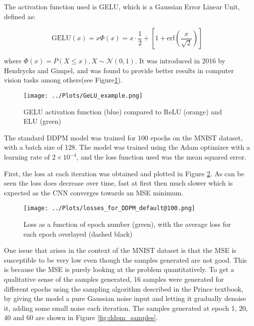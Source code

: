 \documentclass[12pt]{report} %
\begin{document}
The activation function used is GELU, which is a Gaussian Error Linear Unit, defined as:

\begin{equation}
  \text{GELU}(x) = x\Phi(x) = x \cdot \frac{1}{2} + [1 + \text{erf} ( \frac{x}{\sqrt{2}} )]
\end{equation}

where $\Phi(x) = P(X \leq x), X \sim \mathcal{N}(0, 1)$. It was introduced in 2016 by Hendrycks and Gimpel\cite{hendrycks2016gelu}, and was found to provide better results in computer vision tasks among others(see Figure\ref{fig:gelu}).

\begin{figure}[ht]
  \centering
  \texttt{[image: ../Plots/GeLU\_example.png]}
  \captionsetup{font=footnotesize}
  \caption{GELU activation function (blue) compared to ReLU (orange) and ELU (green)}
  \label{fig:gelu}
\end{figure}

The standard DDPM model was trained for 100 epochs on the MNIST dataset, with a batch size of 128. The model was trained using the Adam optimizer \cite{kingma2015adam} with a learning rate of $2 \times 10^{-4}$, and the loss function used was the mean squared error\cite{mse}.

First, the loss at each iteration was obtained and plotted in Figure \ref{fig:loss}. As can be seen the loss does decrease over time, fast at first then much slower which is expected as the CNN converges towards an MSE minimum.

\newpage
\begin{figure}[ht]
  \centering
  \texttt{[image: ../Plots/losses\_for\_DDPM\_default@100.png]}
  \captionsetup{font=footnotesize}
  \caption{Loss as a function of epoch number (green), with the average loss for each epoch overlayed (dashed black)}
  \label{fig:loss}
\end{figure}


One issue that arises in the context of the MNIST dataset is that the MSE is susceptible to be very low even though the samples generated are not good. This is because the MSE is purely looking at the problem quantitatively. To get a qualitative sense of the samples generated, 16 samples were generated for different epochs using the sampling algorithm described in the Prince textbook\cite[p. 363]{prince2023understanding}, by giving the model a pure Gaussian noise input and letting it gradually denoise it, adding some small noise each iteration. The samples generated at epoch 1, 20, 40 and 60 are shown in Figure \ref{fig:ddpm_samples}.
\end{document}
